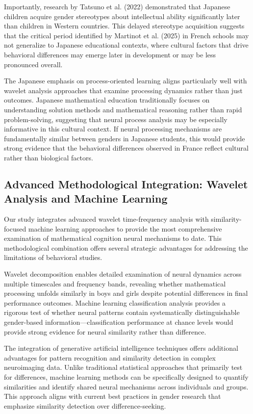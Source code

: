 \documentclass[pdflatex,sn-nature]{sn-jnl}%
\theoremstyle{thmstyleone}%
\theoremstyle{thmstyletwo}%
\theoremstyle{thmstylethree}%
\begin{document}
Importantly, research by Tatsuno et al. (2022)\cite{tatsuno2022development} demonstrated that Japanese children acquire gender stereotypes about intellectual ability significantly later than children in Western countries. This delayed stereotype acquisition suggests that the critical period identified by Martinot et al. (2025)\cite{martinot2025mathematical} in French schools may not generalize to Japanese educational contexts, where cultural factors that drive behavioral differences may emerge later in development or may be less pronounced overall.

The Japanese emphasis on process-oriented learning aligns particularly well with wavelet analysis approaches that examine processing dynamics rather than just outcomes. Japanese mathematical education traditionally focuses on understanding solution methods and mathematical reasoning rather than rapid problem-solving, suggesting that neural process analysis may be especially informative in this cultural context. If neural processing mechanisms are fundamentally similar between genders in Japanese students, this would provide strong evidence that the behavioral differences observed in France reflect cultural rather than biological factors.


\subsection{Advanced Methodological Integration: Wavelet Analysis and Machine Learning}
Our study integrates advanced wavelet time-frequency analysis with similarity-focused machine learning approaches to provide the most comprehensive examination of mathematical cognition neural mechanisms to date. This methodological combination offers several strategic advantages for addressing the limitations of behavioral studies.

Wavelet decomposition enables detailed examination of neural dynamics across multiple timescales and frequency bands, revealing whether mathematical processing unfolds similarly in boys and girls despite potential differences in final performance outcomes. Machine learning classification analysis provides a rigorous test of whether neural patterns contain systematically distinguishable gender-based information—classification performance at chance levels would provide strong evidence for neural similarity rather than difference.

The integration of generative artificial intelligence techniques offers additional advantages for pattern recognition and similarity detection in complex neuroimaging data. Unlike traditional statistical approaches that primarily test for differences, machine learning methods can be specifically designed to quantify similarities and identify shared neural mechanisms across individuals and groups\cite{poldrack2020establishment}. This approach aligns with current best practices in gender research that emphasize similarity detection over difference-seeking.
\end{document}
